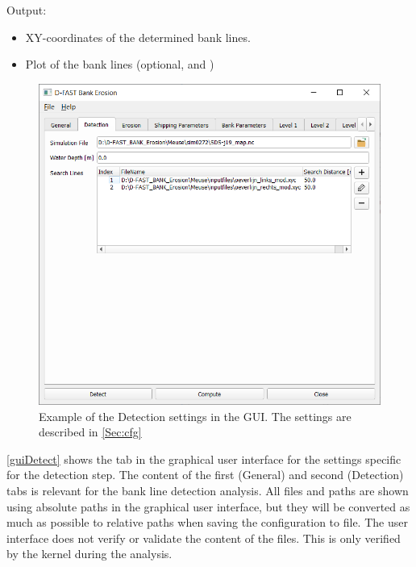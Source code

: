 Output:

\begin{itemize}
\item XY-coordinates of the determined bank lines.
\item Plot of the bank lines (optional,  and )
\end{itemize}

\begin{figure}[!b]
	\center
	\includegraphics[width=\textwidth]{figures/gui2.png}
	\caption{Example of the Detection settings in the GUI. The settings are described in \autoref{Sec:cfg}}
	\label{guiDetect}
	\vspace*{-0.5cm} 
\end{figure}

\autoref{guiDetect} shows the tab in the graphical user interface for the settings specific for the detection step.
The content of the first (General) and second (Detection) tabs is relevant for the bank line detection analysis.
All files and paths are shown using absolute paths in the graphical user interface, but they will be converted as much as possible to relative paths when saving the configuration to file.
The user interface does not verify or validate the content of the files.
This is only verified by the kernel during the analysis.

